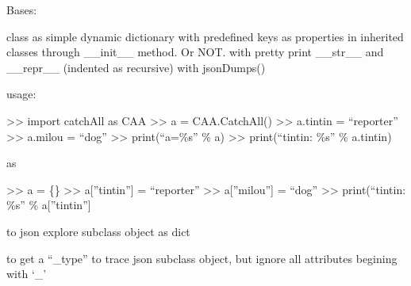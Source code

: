 \documentclass[a4paper,10pt,english]{sphinxmanual}
\begin{document}
\begin{fulllineitems}
\label{commands/apidoc/src:src.catchAll.CatchAll}
Bases: 

class as simple dynamic dictionary 
with predefined keys as properties in
inherited classes through \_\_init\_\_ method. Or NOT. 
with pretty print \_\_str\_\_ and \_\_repr\_\_ (indented as recursive)
with jsonDumps()

usage:

\textgreater{}\textgreater{} import catchAll as CAA
\textgreater{}\textgreater{} a = CAA.CatchAll()
\textgreater{}\textgreater{} a.tintin = ``reporter''
\textgreater{}\textgreater{} a.milou = ``dog''
\textgreater{}\textgreater{} print(``a=\%s'' \% a)
\textgreater{}\textgreater{} print(``tintin: \%s'' \% a.tintin)

as

\textgreater{}\textgreater{} a = \{\}
\textgreater{}\textgreater{} a{[}''tintin''{]} = ``reporter''
\textgreater{}\textgreater{} a{[}''milou''{]} = ``dog''
\textgreater{}\textgreater{} print(``tintin: \%s'' \% a{[}''tintin''{]}

\begin{fulllineitems}
\label{commands/apidoc/src:src.catchAll.CatchAll.jsonDumps}
\end{fulllineitems}


\end{fulllineitems}


\begin{fulllineitems}
\label{commands/apidoc/src:src.catchAll.dumper}
to json explore subclass object as dict

\end{fulllineitems}


\begin{fulllineitems}
\label{commands/apidoc/src:src.catchAll.dumperType}
to get a ``\_type'' to trace json subclass object,
but ignore all attributes begining with `\_'

\end{fulllineitems}
\end{document}
